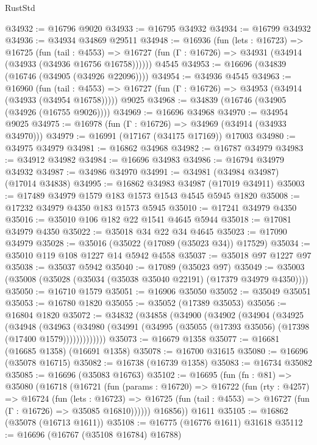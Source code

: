 \begin{lexlean}{RustStd}
\begin{coremodule}
@34932 := @16796 @9020
@34933 := @16795 @34932
@34934 := @16799 @34932
@34936 := @34934 @34869 @29511
@34948 := @16936
    (fun (lets : @16723) =>
    @16725
      (fun (tail : @4553) =>
      @16727 (fun (Γ : @16726) => @34931 (@34914 (@34933 (@34936 @16756 @16758))))))
    @4545
@34953 := @16696 (@34839 (@16746 (@34905 (@34926 @22096))))
@34954 := @34936 @4545
@34963 := @16960
    (fun (tail : @4553) => @16727 (fun (Γ : @16726) => @34953 (@34914 (@34933 (@34954 @16758)))))
    @9025
@34968 := @34839 (@16746 (@34905 (@34926 (@16755 @9026))))
@34969 := @16696 @34968
@34970 := @34954 @9025
@34975 := @16978 (fun (Γ : @16726) => @34969 (@34914 (@34933 @34970)))
@34979 := @16991 (@17167 (@34175 @17169)) @17003
@34980 := @34975 @34979
@34981 := @16862 @34968
@34982 := @16787 @34979
@34983 := @34912 @34982
@34984 := @16696 @34983
@34986 := @16794 @34979 @34932
@34987 := @34986 @34970
@34991 := @34981 (@34984 @34987) (@17014 @34838)
@34995 := @16862 @34983 @34987 (@17019 @34911)
@35003 := @17489 @34979 @1579 @183 @1573 @1543 @4545 @5945 @1820
@35008 := @17232 @34979 @4350 @183 @1573 @5945
@35010 := @17241 @34979 @4350
@35016 := @35010 @106 @182 @22 @1541 @4645 @5944
@35018 := @17081 @34979 @4350
@35022 := @35018 @34 @22 @34 @4645
@35023 := @17090 @34979
@35028 := @35016 (@35022 (@17089 (@35023 @34)) @17529)
@35034 := @35010 @119 @108 @1227 @14 @5942 @4558
@35037 := @35018 @97 @1227 @97
@35038 := @35037 @5942
@35040 := @17089 (@35023 @97)
@35049 := @35003 (@35008 (@35028 (@35034 (@35038 @35040 @22191) (@17379 @34979 @4350))))
@35050 := @16710 @1579
@35051 := @16906 @35050
@35052 := @35049 @35051
@35053 := @16780 @1820
@35055 := @35052 (@17389 @35053)
@35056 := @16804 @1820
@35072 := @34832
    (@34858
      (@34900
        (@34902
          (@34904
            (@34925
              (@34948
                (@34963
                  (@34980 (@34991 (@34995 (@35055 (@17393 @35056) (@17398 (@17400 @1579)))))))))))))
@35073 := @16679 @1358
@35077 := @16681 (@16685 @1358) (@16691 @1358)
@35078 := @16700 @31615
@35080 := @16696 (@35078 @16715)
@35082 := @16738 (@16739 @1358)
@35083 := @16734 @35082
@35085 := @16696 (@35083 @16763)
@35102 := @16695
    (fun (fn : @81) =>
    @35080
      (@16718
        (@16721
          (fun (params : @16720) =>
          @16722
            (fun (rty : @4257) =>
            @16724
              (fun (lets : @16723) =>
              @16725 (fun (tail : @4553) => @16727 (fun (Γ : @16726) => @35085 @16810))))))
        @16856))
    @1611
@35105 := @16862 (@35078 (@16713 @1611))
@35108 := @16775 (@16776 @1611) @31618
@35112 := @16696 (@16767 (@35108 @16784) @16788)

\end{coremodule}
\end{lexlean}
